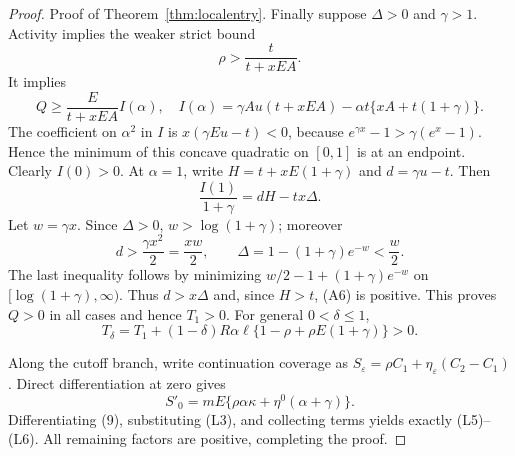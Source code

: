 \documentclass[mnsc,blindrev]{informs3}
\begin{document}
\begin{proof}{Proof of Theorem~\ref{thm:localentry}.}
Finally suppose $\Delta>0$ and $\gamma>1$.  Activity implies the weaker
strict bound
\[
 \rho>\frac{t}{t+xEA}.
\]
It implies
\[
 Q\ge\frac{E}{t+xEA}I(\alpha),\quad
 I(\alpha)=\gamma Au(t+xEA)-\alpha t\{xA+t(1+\gamma)\}.
                                                                    \tag{A5}
\]
The coefficient on $\alpha^2$ in $I$ is
$x(\gamma Eu-t)<0$, because
$e^{\gamma x}-1>\gamma(e^x-1)$.  Hence the minimum of this concave quadratic
on $[0,1]$ is at an endpoint.  Clearly $I(0)>0$.  At $\alpha=1$, write
$H=t+xE(1+\gamma)$ and $d=\gamma u-t$.  Then
\[
 \frac{I(1)}{1+\gamma}=dH-tx\Delta.                         \tag{A6}
\]
Let $w=\gamma x$.  Since $\Delta>0$, $w>\log(1+\gamma)$; moreover
\[
 d>\frac{\gamma x^2}{2}=\frac{xw}{2},\qquad
 \Delta=1-(1+\gamma)e^{-w}<\frac w2.
\]
The last inequality follows by minimizing
$w/2-1+(1+\gamma)e^{-w}$ on
$[\log(1+\gamma),\infty)$.  Thus $d>x\Delta$ and, since $H>t$,
(A6) is positive.  This proves $Q>0$ in all cases and hence $T_1>0$.
For general $0<\delta\le1$,
\[
 T_\delta=T_1+(1-\delta)R\alpha\ell
 \{1-\rho+\rho E(1+\gamma)\}>0.
\]

Along the cutoff branch, write continuation coverage as
$S_\varepsilon=\rho C_1+\eta_\varepsilon(C_2-C_1)$.  Direct
differentiation at zero gives
\[
 S'_0=mE\{\rho\alpha\kappa+\eta^0(\alpha+\gamma)\}.
\]
Differentiating (9), substituting (L3), and collecting terms yields exactly
(L5)--(L6).  All remaining factors are positive, completing the proof.
\Halmos\end{proof}
\end{document}

